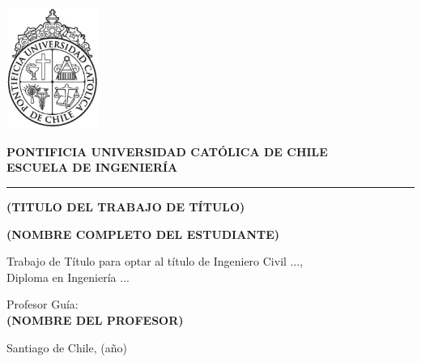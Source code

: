 \begin{flushleft}
    \begin{minipage}{0.2\textwidth}
        \centering
        \includegraphics[width=3cm]{content/logo.png}
    \end{minipage}%
    \begin{minipage}{0.7\textwidth}
        \vspace*{0.5cm} %
        \centering
        \textbf{PONTIFICIA UNIVERSIDAD CATÓLICA DE CHILE}\\
        \textbf{ESCUELA DE INGENIERÍA}
    \end{minipage}
\end{flushleft}

\vspace{1cm}
\hrule

\vspace{4cm}

\begin{center}
    {\LARGE\textbf{(TITULO DEL TRABAJO DE TÍTULO)}}

    \vspace{2cm}
    {\large\textbf{(NOMBRE COMPLETO DEL ESTUDIANTE)}}
\end{center}

\vspace{3cm}

\noindent Trabajo de Título para optar al título de Ingeniero Civil ...,\\
Diploma en Ingeniería ...

\vspace{2cm}

\noindent Profesor Guía:\\
\textbf{(NOMBRE DEL PROFESOR)}

\vfill

\begin{flushleft}
    Santiago de Chile, (año)
\end{flushleft}
\newpage
